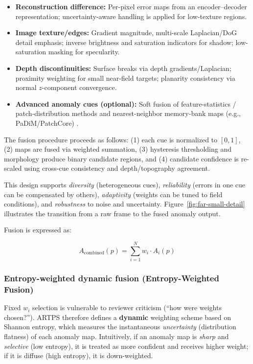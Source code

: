 \documentclass[12pt]{article}
\begin{document}
\begin{itemize}
  \item \textbf{Reconstruction difference:} Per-pixel error maps from an encoder--decoder representation; uncertainty-aware handling is applied for low-texture regions.
  \item \textbf{Image texture/edges:} Gradient magnitude, multi-scale Laplacian/DoG detail emphasis; inverse brightness and saturation indicators for shadow; low-saturation masking for specularity.
  \item \textbf{Depth discontinuities:} Surface breaks via depth gradients/Laplacian; proximity weighting for small near-field targets; planarity consistency via normal \(z\)-component convergence.
  \item \textbf{Advanced anomaly cues (optional):} Soft fusion of feature-statistics / patch-distribution methods and nearest-neighbor memory-bank maps (e.g., PaDiM/PatchCore) \cite{defard2021padim,roth2021towards}.
\end{itemize}

The fusion procedure proceeds as follows: (1) each cue is normalized to \([0,1]\), (2) maps are fused via weighted summation, (3) hysteresis thresholding and morphology produce binary candidate regions, and (4) candidate confidence is re-scaled using cross-cue consistency and depth/topography agreement.

This design supports \emph{diversity} (heterogeneous cues), \emph{reliability} (errors in one cue can be compensated by others), \emph{adaptivity} (weights can be tuned to field conditions), and \emph{robustness} to noise and uncertainty. Figure~\ref{fig:far-small-detail} illustrates the transition from a raw frame to the fused anomaly output.

Fusion is expressed as:

\[ A_{\text{combined}}(p) = \sum_{i=1}^{N} w_i \cdot A_i(p) \]

\subsubsection{Entropy-weighted dynamic fusion (Entropy-Weighted Fusion)}
Fixed \(w_i\) selection is vulnerable to reviewer criticism (“how were weights chosen?”). ARTPS therefore defines a \textbf{dynamic} weighting scheme based on Shannon entropy, which measures the instantaneous \emph{uncertainty} (distribution flatness) of each anomaly map. Intuitively, if an anomaly map is \emph{sharp} and \emph{selective} (low entropy), it is treated as more confident and receives higher weight; if it is diffuse (high entropy), it is down-weighted.
\end{document}

